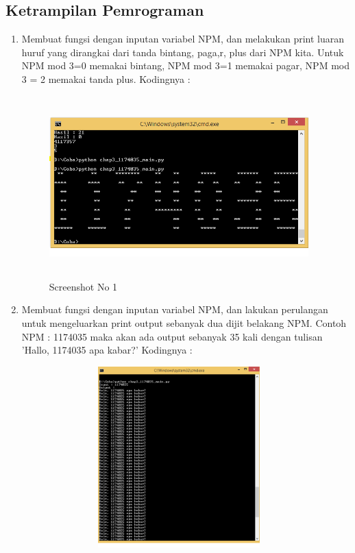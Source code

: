\subsection{Ketrampilan Pemrograman}
\begin{enumerate}
	\item Membuat fungsi dengan inputan variabel NPM, dan melakukan print luaran huruf yang dirangkai dari tanda bintang, paga,r, plus dari NPM kita. Untuk NPM mod 3=0 memakai bintang, NPM mod 3=1 memakai pagar, NPM mod 3 = 2 memakai tanda plus. Kodingnya : 
	
	\begin{figure}[!htbp]
        \centering
        \includegraphics[height=7cm, width=10cm]{figures/chapter3/1174035_1.png}
        \caption{Screenshot No 1}
        \label{1174035_1}
	\end{figure}
	\item Membuat fungsi dengan inputan variabel NPM, dan lakukan perulangan untuk mengeluarkan print output sebanyak dua dijit belakang NPM. Contoh NPM : 1174035 maka akan ada output sebanyak 35 kali dengan tulisan 'Hallo, 1174035 apa kabar?' Kodingnya : 
	
	\begin{figure}[!htbp]
        \centering
        \includegraphics[height=7cm, width=10cm]{figures/chapter3/1174035_2.png}

\end{figure}
\end{enumerate}
